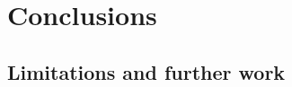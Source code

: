 
\section{Conclusions}%
\label{sec:conclusions}


\subsection{Limitations and further work}%
\label{sub:limitations}
